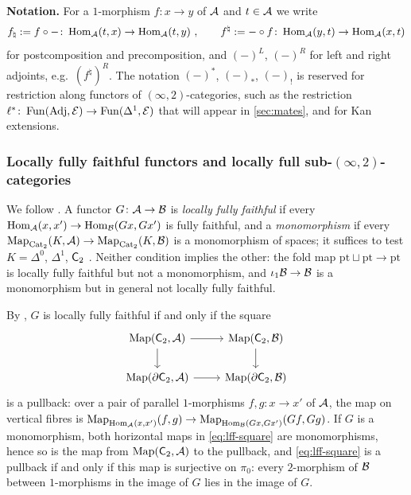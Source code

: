 %
\textbf{Notation.} For a $1$-morphism $f\colon x \to y$ of $\mathcal{A}$ and $t \in \mathcal{A}$
we write
\begin{equation*}
f_{\natural} := f \circ -\colon \operatorname{Hom}_{\mathcal{A}}(t,x) \to \operatorname{Hom}_{\mathcal{A}}(t,y) \ ,
\qquad f^{\natural} := - \circ f\colon \operatorname{Hom}_{\mathcal{A}}(y,t) \to \operatorname{Hom}_{\mathcal{A}}(x,t)
\end{equation*}
for postcomposition and precomposition, and $(-)^{L}$,
$(-)^{R}$ for left and right adjoints, e.g.\ $(f^{\natural})^{R}$.
The notation $(-)^{*}$, $(-)_{*}$, $(-)_{!}$ is reserved for restriction along
functors of $(\infty,2)$-categories, such as the restriction
$\ell^{*}\colon \operatorname{Fun}(\mathrm{Adj},\mathcal{E}) \to \operatorname{Fun}(\Delta^{1},\mathcal{E})$
that will appear in \cref{sec:mates}, and for Kan extensions.

\subsubsection*{Locally fully faithful functors and locally full sub-$(\infty,2)$-categories}
%
We follow \cite[\S 2.6]{abellangagnahaugseng2024straightening}.
A functor $G\colon \mathcal{A} \to \mathcal{B}$ is \emph{locally fully faithful} if every
$\operatorname{Hom}_{\mathcal{A}}(x,x') \to \operatorname{Hom}_{\mathcal{B}}(Gx,Gx')$
is fully faithful, and a \emph{monomorphism} if every
$\operatorname{Map}_{\mathrm{Cat}_{2}}(K,\mathcal{A}) \to \operatorname{Map}_{\mathrm{Cat}_{2}}(K,\mathcal{B})$
is a monomorphism of spaces; it suffices to test $K = \Delta^{0}$, $\Delta^{1}$,
$\mathsf{C}_{2}$ \cite[Prop.~2.6.10]{abellangagnahaugseng2024straightening}.
Neither condition implies the other: the fold map
$\mathrm{pt} \sqcup \mathrm{pt} \to \mathrm{pt}$
is locally fully faithful but not a monomorphism,
and $\iota_{1}\mathcal{B} \to \mathcal{B}$ is a monomorphism but in general not locally fully
faithful.

%
By \cite[Prop.~2.6.5]{abellangagnahaugseng2024straightening},
$G$ is locally fully faithful if and only if the square
\begin{equation}
\label{eq:lff-square}
\begin{tikzcd}
\mapp(\wtc,\A) \ar[r] \ar[d] & \mapp(\wtc,\B) \ar[d] \\
\mapp(\bwtc,\A) \ar[r] & \mapp(\bwtc,\B)
\end{tikzcd}
\end{equation}
is a pullback: over a pair of parallel $1$-morphisms $f,g\colon x \to x'$ of
$\mathcal{A}$, the map on vertical fibres is
$\operatorname{Map}_{\operatorname{Hom}_{\mathcal{A}}(x,x')}(f,g) \to \operatorname{Map}_{\operatorname{Hom}_{\mathcal{B}}(Gx,Gx')}(Gf,Gg)$.
If $G$ is a monomorphism, both horizontal maps in \eqref{eq:lff-square} are
monomorphisms, hence so is the map from $\operatorname{Map}(\mathsf{C}_{2},\mathcal{A})$ to the pullback,
and \eqref{eq:lff-square} is a pullback if and only if this map is surjective on
$\pi_{0}$: every $2$-morphism of $\mathcal{B}$ between $1$-morphisms in the image of $G$
lies in the image of $G$.

